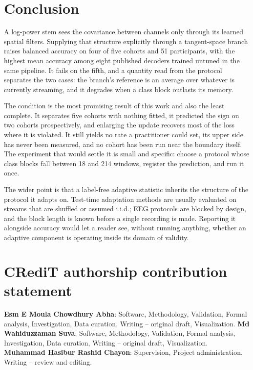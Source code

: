\documentclass[a4paper,fleqn]{cas-dc}
\begin{document}
\section{Conclusion}

A log-power stem sees the covariance between channels only through its learned spatial filters. Supplying that structure explicitly through a tangent-space branch raises balanced accuracy on four of five cohorts and 51 participants, with the highest mean accuracy among eight published decoders trained untuned in the same pipeline. It fails on the fifth, and a quantity read from the protocol separates the two cases: the branch's reference is an average over whatever is currently streaming, and it degrades when a class block outlasts its memory.

The condition is the most promising result of this work and also the least complete. It separates five cohorts with nothing fitted, it predicted the sign on two cohorts prospectively, and enlarging the update recovers most of the loss where it is violated. It still yields no rate a practitioner could set, its upper side has never been measured, and no cohort has been run near the boundary itself. The experiment that would settle it is small and specific: choose a protocol whose class blocks fall between 18 and 214 windows, register the prediction, and run it once.

The wider point is that a label-free adaptive statistic inherits the structure of the protocol it adapts on. Test-time adaptation methods are usually evaluated on streams that are shuffled or assumed i.i.d.; EEG protocols are blocked by design, and the block length is known before a single recording is made. Reporting it alongside accuracy would let a reader see, without running anything, whether an adaptive component is operating inside its domain of validity.

\section*{CRediT authorship contribution statement}
\textbf{Esm E Moula Chowdhury Abha}: Software, Methodology, Validation,
Formal analysis, Investigation, Data curation, Writing -- original draft,
Visualization.
\textbf{Md Wahiduzzaman Suva}: Software, Methodology, Validation,
Formal analysis, Investigation, Data curation, Writing -- original draft,
Visualization.
\textbf{Muhammad Hasibur Rashid Chayon}: Supervision, Project administration,
Writing -- review and editing.
\end{document}
